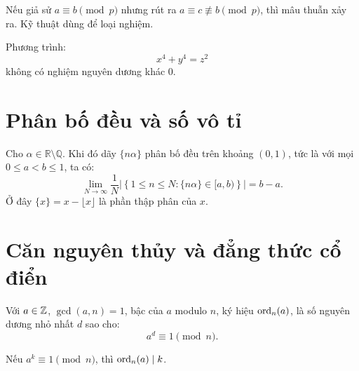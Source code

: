 \documentclass[../imo-training-open-book.tex]{subfiles}
\begin{document}
\vspace{1em}

\begin{lemma}
    \label{lemma:modular-contradiction}
    Nếu giả sử \( a \equiv b \pmod{p} \) nhưng rút ra \( a \equiv c \not\equiv b \pmod{p} \), thì mâu thuẫn xảy ra. Kỹ thuật dùng để loại nghiệm.
\end{lemma}

\vspace{1em}

\begin{theorem}
    \label{theorem:fermat-christmas}
    Phương trình:
    \[
        x^4 + y^4 = z^2
    \]
    không có nghiệm nguyên dương khác 0.
\end{theorem}

\newpage

\section{Phân bố đều và số vô tỉ}

\begin{lemma}
    \label{lemma:irrational-uniform-distribution}
    Cho \( \alpha \in \mathbb{R} \setminus \mathbb{Q} \). Khi đó dãy \( \{ n\alpha \} \) phân bố đều trên khoảng \( (0,1) \), tức là với mọi \( 0 \le a < b \le 1 \), ta có:
    \[
        \lim_{N \to \infty} \frac{1}{N} \left| \left\{ 1 \le n \le N : \{ n\alpha \} \in [a, b) \right\} \right| = b - a.
    \]
    Ở đây \( \{x\} = x - \lfloor x \rfloor \) là phần thập phân của \( x \).
\end{lemma}

\newpage

\section{Căn nguyên thủy và đẳng thức cổ điển}

\begin{definition}
    \label{definition:order-modulo-n}
    Với \( a \in \mathbb Z \), \( \gcd(a, n) = 1 \), bậc của \( a \) modulo \( n \), ký hiệu \( \operatorname{ord}_n(a) \), là số nguyên dương nhỏ nhất \( d \) sao cho:
    \[
        a^d \equiv 1 \pmod{n}.
    \]
\end{definition}

\vspace{1em}

\begin{theorem}
    \label{theorem:order-divides-exponent}
    Nếu \( a^k \equiv 1 \pmod{n} \), thì \( \operatorname{ord}_n(a) \mid k \).
\end{theorem}
\end{document}

